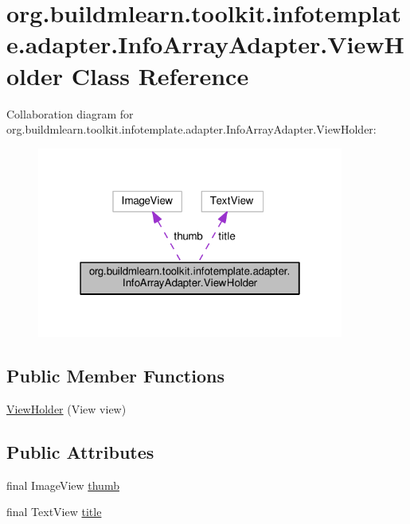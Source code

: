 \hypertarget{classorg_1_1buildmlearn_1_1toolkit_1_1infotemplate_1_1adapter_1_1InfoArrayAdapter_1_1ViewHolder}{}\section{org.\+buildmlearn.\+toolkit.\+infotemplate.\+adapter.\+Info\+Array\+Adapter.\+View\+Holder Class Reference}
\label{classorg_1_1buildmlearn_1_1toolkit_1_1infotemplate_1_1adapter_1_1InfoArrayAdapter_1_1ViewHolder}


Collaboration diagram for org.\+buildmlearn.\+toolkit.\+infotemplate.\+adapter.\+Info\+Array\+Adapter.\+View\+Holder\+:
\nopagebreak
\begin{figure}[H]
\begin{center}
\leavevmode
\includegraphics[width=286pt]{classorg_1_1buildmlearn_1_1toolkit_1_1infotemplate_1_1adapter_1_1InfoArrayAdapter_1_1ViewHolder__coll__graph}
\end{center}
\end{figure}
\subsection*{Public Member Functions}
\begin{DoxyCompactItemize}
\item 
\hyperlink{classorg_1_1buildmlearn_1_1toolkit_1_1infotemplate_1_1adapter_1_1InfoArrayAdapter_1_1ViewHolder_ab9081a4671b563f1df2c12051794c16f}{View\+Holder} (View view)
\end{DoxyCompactItemize}
\subsection*{Public Attributes}
\begin{DoxyCompactItemize}
\item 
final Image\+View \hyperlink{classorg_1_1buildmlearn_1_1toolkit_1_1infotemplate_1_1adapter_1_1InfoArrayAdapter_1_1ViewHolder_a074d975264bd0e7cc275ede4f504d065}{thumb}
\item 
final Text\+View \hyperlink{classorg_1_1buildmlearn_1_1toolkit_1_1infotemplate_1_1adapter_1_1InfoArrayAdapter_1_1ViewHolder_a7643252f2b77d6945ef59b29805cf1c1}{title}
\end{DoxyCompactItemize}


